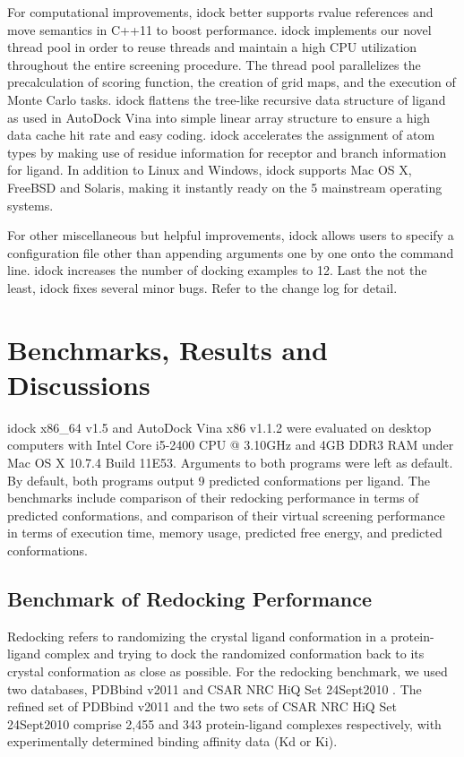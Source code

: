 For computational improvements, idock better supports rvalue references and move semantics in C++11 to boost performance. idock implements our novel thread pool in order to reuse threads and maintain a high CPU utilization throughout the entire screening procedure. The thread pool parallelizes the precalculation of scoring function, the creation of grid maps, and the execution of Monte Carlo tasks. idock flattens the tree-like recursive data structure of ligand as used in AutoDock Vina into simple linear array structure to ensure a high data cache hit rate and easy coding. idock accelerates the assignment of atom types by making use of residue information for receptor and branch information for ligand. In addition to Linux and Windows, idock supports Mac OS X, FreeBSD and Solaris, making it instantly ready on the 5 mainstream operating systems.

For other miscellaneous but helpful improvements, idock allows users to specify a configuration file other than appending arguments one by one onto the command line. idock increases the number of docking examples to 12. Last the not the least, idock fixes several minor bugs. Refer to the change log for detail.

\section{Benchmarks, Results and Discussions}

idock x86\_64 v1.5 and AutoDock Vina x86 v1.1.2 were evaluated on desktop computers with Intel Core i5-2400 CPU @ 3.10GHz and 4GB DDR3 RAM under Mac OS X 10.7.4 Build 11E53. Arguments to both programs were left as default. By default, both programs output 9 predicted conformations per ligand. The benchmarks include comparison of their redocking performance in terms of predicted conformations, and comparison of their virtual screening performance in terms of execution time, memory usage, predicted free energy, and predicted conformations.

\subsection{Benchmark of Redocking Performance}

Redocking refers to randomizing the crystal ligand conformation in a protein-ligand complex and trying to dock the randomized conformation back to its crystal conformation as close as possible. For the redocking benchmark, we used two databases, PDBbind v2011 \citep{529,530} and CSAR NRC HiQ Set 24Sept2010 \citep{857,960}. The refined set of PDBbind v2011 and the two sets of CSAR NRC HiQ Set 24Sept2010 comprise 2,455 and 343 protein-ligand complexes respectively, with experimentally determined binding affinity data (Kd or Ki).

